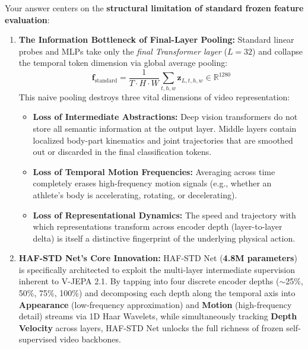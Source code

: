 \documentclass[a4paper, 11pt]{article}
\begin{document}
Your answer centers on the \textbf{structural limitation of standard frozen feature evaluation}:

\begin{enumerate}[leftmargin=*]
    \item \textbf{The Information Bottleneck of Final-Layer Pooling:}
    Standard linear probes and MLPs take only the \emph{final Transformer layer} ($L=32$) and collapse the temporal token dimension via global average pooling:
    \begin{equation}
        \mathbf{f}_{\text{standard}} = \frac{1}{T \cdot H \cdot W} \sum_{t,h,w} \mathbf{z}_{L, t, h, w} \in \mathbb{R}^{1280}
    \end{equation}
    This naive pooling destroys three vital dimensions of video representation:
    \begin{itemize}
        \item \textbf{Loss of Intermediate Abstractions:} Deep vision transformers do not store all semantic information at the output layer. Middle layers contain localized body-part kinematics and joint trajectories that are smoothed out or discarded in the final classification tokens.
        \item \textbf{Loss of Temporal Motion Frequencies:} Averaging across time completely erases high-frequency motion signals (e.g., whether an athlete's body is accelerating, rotating, or decelerating).
        \item \textbf{Loss of Representational Dynamics:} The speed and trajectory with which representations transform across encoder depth (layer-to-layer delta) is itself a distinctive fingerprint of the underlying physical action.
    \end{itemize}

    \item \textbf{HAF-STD Net's Core Innovation:}
    HAF-STD Net (\textbf{4.8M parameters}) is specifically architected to exploit the multi-layer intermediate supervision inherent to V-JEPA 2.1. By tapping into four discrete encoder depths ($\sim$25\%, 50\%, 75\%, 100\%) and decomposing each depth along the temporal axis into \textbf{Appearance} (low-frequency approximation) and \textbf{Motion} (high-frequency detail) streams via 1D Haar Wavelets, while simultaneously tracking \textbf{Depth Velocity} across layers, HAF-STD Net unlocks the full richness of frozen self-supervised video backbones.
\end{enumerate}
\end{document}
